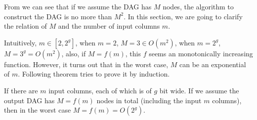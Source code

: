 
From  we can see that if we assume the {DAG} has $M$
nodes, the algorithm to construct the {DAG} is no more than $M^2$. In
this section, we are going to clarify the relation of $M$ and the number
of input columns $m$.

Intuitively, $m \in [2, 2^g]$, when $m = 2$, $M = 3 \in O(m^2)$, when 
$m = 2^g$, $M = 3^g = O(m^2)$, also, if $M = f(m)$, this $f$ seems an 
monotonically increasing function. However, it turns out that in the 
worst case, $M$ can be an exponential of $m$. Following theorem tries to 
prove it by induction.

\begin{theorem}
If there are $m$ input columns, each of which is of $g$ bit wide. If we
assume the output {DAG} has $M = f(m)$ nodes in total (including the
input $m$ columns), then in the worst case $M = f(m) = O(2^g)$.
\label{thm:worstCaseM}
\end{theorem}

